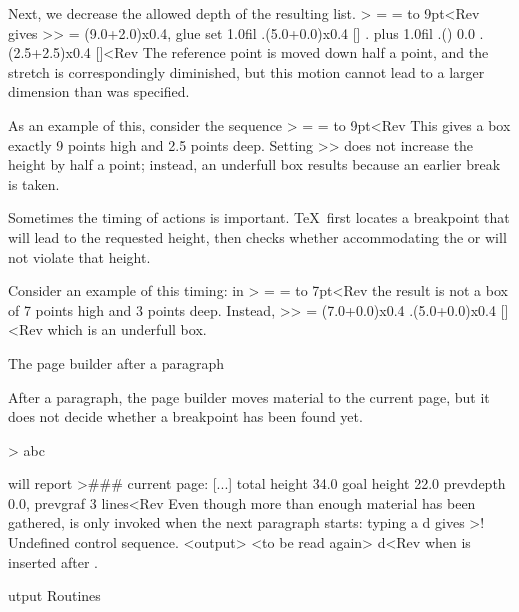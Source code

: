 Next, we decrease the allowed depth of the resulting list.
\Ver>\splitmaxdepth=2pt 
=\vbox{\High \vfil \HighAndDeep}
= to 9pt<Rev gives
\Ver>> =
\vbox(9.0+2.0)x0.4, glue set 1.0fil
.\hbox(5.0+0.0)x0.4 []
. plus 1.0fil
.\glue(\lineskip) 0.0
.\hbox(2.5+2.5)x0.4 []<Rev
The reference point is moved down half a point,
and the stretch is correspondingly diminished,
\alt
but this motion cannot lead to a larger dimension
than was specified.

As an example of this,
\alt
consider the sequence \Ver>\splitmaxdepth=3pt 
=\vbox{\High \kern1.5pt \HighAndDeep}
= to 9pt<Rev
This gives a box exactly 9 points high and 2.5 points deep.
Setting \ver>\splitmaxdepth=2pt> does not increase
the height by half a point; instead, an underfull box
results because an earlier break is taken.

Sometimes the timing of actions is important.
\TeX\ first locates a breakpoint that will lead
to the requested height, then checks whether accommodating
the  or  will not
violate that height.

Consider an example of this timing:
\alt
in
\Ver>\splitmaxdepth=4pt 
=\vbox{\High \vfil \HighAndDeep}
= to 7pt<Rev
the result is {\italic not\/} a box
of 7 points high and 3 points deep. Instead,
\Ver>> =
\vbox(7.0+0.0)x0.4
.\hbox(5.0+0.0)x0.4 []<Rev
which is an underfull box.

 The page builder after a paragraph

After a paragraph, the page builder moves material
to the current page, but it does not decide whether a breakpoint
has been found yet.

\example\Ver>
\output{\interrupt \plainoutput}%
\def\nl{\hfil\break}\vsize=22pt %
a\nl b\nl c\par \showlists      %
will report
\Ver>### current page:
[...]
total height 34.0
 goal height 22.0
prevdepth 0.0, prevgraf 3 lines<Rev Even though more than enough
material has been gathered,  is only invoked
when the next paragraph starts: typing a \n d gives
\Ver>! Undefined control sequence.
<output> {\interrupt 
                     \plainoutput }
<to be read again> 
                   d<Rev
when  is inserted after .
\>



\subject[output]  Output Routines

